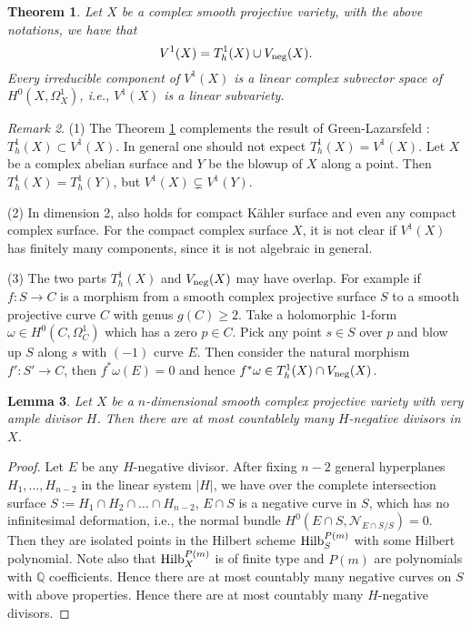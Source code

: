 \documentclass[a4paper,12pt,reqno]{amsart}
\newtheorem{theorem}{Theorem}[section]
\theoremstyle{plain}
\newtheorem{lemma}[theorem]{Lemma}
\theoremstyle{remark}
\newtheorem{remark}[theorem]{Remark}
\newcommand{\Q}{\mathbb Q}
\begin{document}
\begin{theorem}\label{Thm:Proj-codim1}
 Let $X$ be a complex smooth projective variety, with the above notations, we have that 
$$V^1(X)= T_h^1(X)\cup V_{\textnormal{neg}}(X).
$$
Every irreducible component of $V^1(X)$ is a linear complex subvector space of $H^0(X, \Omega_X^1)$, i.e., $V^1(X)$ is a linear subvariety. %
\end{theorem}

\begin{remark} (1) The Theorem \ref{Thm:Proj-codim1} complements the result of Green-Lazarsfeld \cite{GL87}: $T_h^1(X) \subset V^1(X)$. In general one should not expect $T_h^1(X) = V^1(X)$. Let $X$ be a complex abelian surface and $Y$ be the blowup of $X$ along a point. Then $T_h^1(X)=T_h^1(Y)$, but  $V^1(X)\subsetneq V^1(Y)$.

(2) In dimension 2, \cite[Theorem 2]{Sp88} also holds for compact K\"ahler surface and even any compact complex surface. For the compact complex surface $X$, it is not clear if $V^1(X)$ has finitely many components, since it is not algebraic in general.

(3) The two parts $T_h^1(X)$ and $V_{\textnormal{neg}}(X)$ may have overlap. For example if $f: S\to C$ is a morphism from a smooth complex projective surface $S$ to a smooth projective curve $C$ with genus $g(C)\geq2$. Take a holomorphic 1-form $\omega\in H^0(C, \Omega_C^1)$ which has a zero $p\in C$. Pick any point $s\in S$ over $p$ and blow up $S$ along $s$ with $(-1)$ curve $E$. Then consider the natural morphism $f': S'\to C$, then $f^*\omega(E)=0$ and hence $f^*\omega\in T_h^1(X)\cap V_{\textnormal{neg}}(X)$.
\end{remark}

\begin{lemma} \label{countable} Let $X$ be a $n$-dimensional smooth complex projective variety with very ample divisor $H$. Then there are at most countablely many $H$-negative divisors in $X$.
\end{lemma}

\begin{proof}
Let $E$ be any $H$-negative divisor. After fixing $n-2$ general hyperplanes $H_1, \ldots, H_{n-2}$ in the linear system $|H|$, we have over the complete intersection surface $S:=H_1\cap H_2\cap\ldots\cap H_{n-2}$, $E\cap S$ is a negative curve in $S$, which has no infinitesimal deformation, i.e., the normal bundle $H^0(E\cap S, \mathcal{N}_{E\cap S/S})=0$. Then they are isolated points in the Hilbert scheme $\textnormal{Hilb}_S^{P(m)}$ with some Hilbert polynomial. Note also that $\textnormal{Hilb}_X^{P(m)}$ is of finite type and $P(m)$ are polynomials with $\Q$ coefficients. Hence there are at most countably many negative curves on $S$ with above properties. Hence there are at most countably many $H$-negative divisors.
\end{proof}
\end{document}
